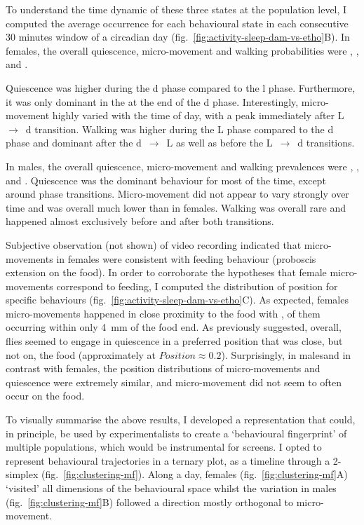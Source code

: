 To understand the time dynamic of these three states at the population level, I computed the average 
occurrence for each behavioural state in each consecutive 30 minutes window of a circadian day (fig.~\ref{fig:activity-sleep-dam-vs-etho}B).
In females, the overall quiescence, micro-movement and walking probabilities were 
,
, and
.

Quiescence was higher during the \gls{d} phase compared to the \gls{l} phase.
Furthermore, it was only dominant in the at the end of the \gls{d} phase. 
Interestingly, micro-movement highly varied with the time of day, with a peak immediately after L~$\rightarrow$~\gls{d} transition.
Walking was higher during the L phase compared to the \gls{d} phase and dominant after the \gls{d}~$\rightarrow$~L as well as before the L~$\rightarrow$~\gls{d} transitions.

In males, the overall quiescence, micro-movement and walking prevalences were 
,
, and
.
Quiescence was the dominant behaviour for most of the time, except around phase transitions.
Micro-movement did not appear to vary strongly over time and was overall much lower than in females.
Walking was overall rare and happened almost exclusively before and after both transitions.

Subjective observation (not shown) of video recording indicated that micro-movements in females were consistent with feeding behaviour (proboscis extension on the food).
In order to corroborate the hypotheses that female micro-movements correspond to feeding, I computed the distribution of position for specific behaviours (fig.~\ref{fig:activity-sleep-dam-vs-etho}C).
As expected, females micro-movements happened in close proximity to the food with , of them occurring within only 4~mm of the food end.
As previously suggested\cite{hendricks_rest_2000}, overall, flies seemed to engage in quiescence in a preferred position that was close, but not on, the food (approximately at $Position \approx 0.2$).
Surprisingly, in males\emd{}and in contrast with females\emd{}, the position distributions of micro-movements and quiescence were extremely similar, and micro-movement did not seem to often occur on the food.


To visually summarise the above results, I developed a representation that could, in principle, be used by experimentalists to create a `behavioural fingerprint' of multiple populations, which would be instrumental for screens.
I opted to represent behavioural trajectories in a ternary plot, as a timeline through a 2-simplex (fig.~\ref{fig:clustering-mf}).
Along a day, females (fig.~\ref{fig:clustering-mf}A) `visited' all dimensions of the behavioural space whilst the variation in males (fig.~\ref{fig:clustering-mf}B) followed a direction mostly orthogonal to micro-movement.

